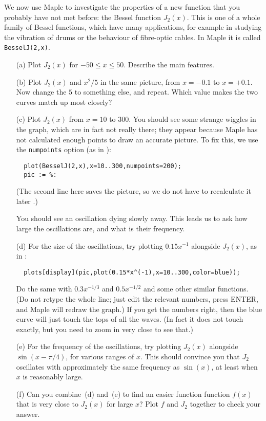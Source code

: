 \documentclass[a4paper,10pt]{amsbook}
\numberwithin{example}{chapter}
\begin{document}
\begin{exercise}\label{ex-bessel}
 We now use Maple to investigate the properties of a new function that
 you probably have not met before: the Bessel function $J_2(x)$.  This
 is one of a whole family of Bessel functions, which have many
 applications, for example in studying the vibration of drums or the
 behaviour of fibre-optic cables.  In Maple it is called
 \verb~BesselJ(2,x)~. 
 \begin{itemize}
  \item[(a)] Plot $J_2(x)$ for $-50\leq x\leq 50$.  Describe the
   main features. 
  \item[(b)] Plot $J_2(x)$ and $x^2/5$ in the same picture, from $x=-0.1$
   to $x=+0.1$.  Now change the $5$ to something else, and repeat. 
   Which value makes the two curves match up most closely? 
  \item[(c)] Plot $J_2(x)$ from $x=10$ to $300$.  You should see some
   strange wiggles in the graph, which are in fact not really there;
   they appear because Maple has not calculated enough points to draw
   an accurate picture.  To fix this, we use the \verb~numpoints~
   option (as in \note{\NOTEnumpoints}):
\begin{verbatim}
  plot(BesselJ(2,x),x=10..300,numpoints=200);
  pic := %:
\end{verbatim}
   (The second line here saves the picture, so we do not have to
   recalculate it later \note{\NOTEsaveplot}.) 

   You should see an oscillation dying slowly away.  This leads us to
   ask how large the oscillations are, and what is their frequency. 
  \item[(d)] For the size of the oscillations, try plotting $0.15x^{-1}$
   alongside $J_2(x)$, as in \note{\NOTEdisplay}:
\begin{verbatim}
  plots[display](pic,plot(0.15*x^(-1),x=10..300,color=blue));
\end{verbatim}
   Do the same with $0.3x^{-1/3}$ and $0.5x^{-1/2}$ and some other
   similar functions.  (Do not retype the whole line; just edit the
   relevant numbers, press ENTER, and Maple will redraw the graph.) 
   If you get the numbers right, then the blue curve will just touch
   the tops of all the waves.  (In fact it does not touch exactly, but
   you need to zoom in very close to see that.) 
  \item[(e)] For the frequency of the oscillations, try plotting
   $J_2(x)$ alongside $\sin(x-\pi/4)$, for various ranges of $x$. 
   This should convince you that $J_2$ oscillates with approximately
   the same frequency as $\sin(x)$, at least when $x$ is reasonably
   large. 
  \item[(f)] Can you combine~(d) and~(e) to find an easier function
   function $f(x)$ that is very close to $J_2(x)$ for large $x$?  Plot
   $f$ and $J_2$ together to check your answer. 
 \end{itemize}
\end{exercise}
\end{document}
